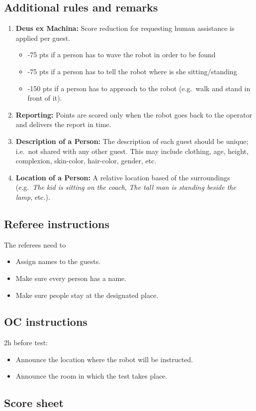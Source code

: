 \subsection{Additional rules and remarks}
\begin{enumerate}[nosep]
	\item \textbf{Deus ex Machina:} Score reduction for requesting human assistance is applied per guest.
	\begin{itemize}
		\item -75 pts if a person has to wave the robot in order to be found
		\item -75 pts if a person has to tell the robot where is she sitting/standing
		\item -150 pts if a person has to approach to the robot (e.g.~walk and stand in front of it).
	\end{itemize}

	\item \textbf{Reporting:} Points are scored only when the robot goes back to the operator and delivers the report in time.

	\item \textbf{Description of a Person:} The description of each guest should be unique; i.e.~not shared with any other guest. This may include clothing, age, height, complexion, skin-color, hair-color, gender, etc.

	\item \textbf{Location of a Person:} A relative location based of the surroundings (e.g.~\textit{The kid is sitting on the coach}, \textit{The tall man is standing beside the lamp}, etc.).
\end{enumerate}


\subsection{Referee instructions}

The referees need to
\begin{itemize}
	\item Assign names to the guests.
	\item Make sure every person has a name.
	\item Make sure people stay at the designated place.
\end{itemize}

\subsection{OC instructions}

2h before test:
\begin{itemize}
	\item Announce the location where the robot will be instructed.
	\item Announce the room in which the test takes place.
\end{itemize}

\subsection{Score sheet}

